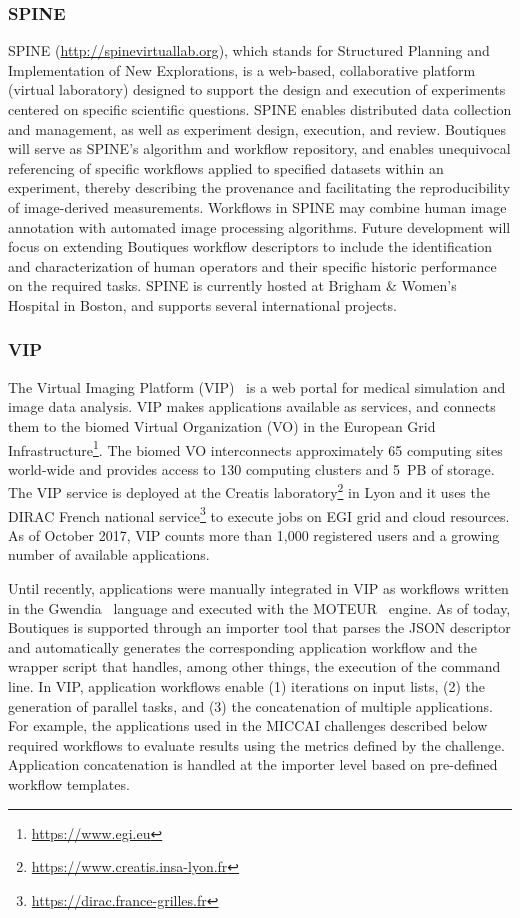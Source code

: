 \documentclass[a4paper,num-refs]{oup-contemporary}
\begin{document}
\subsubsection{SPINE}
SPINE (\url{http://spinevirtuallab.org}), which stands for Structured
Planning and Implementation of New Explorations, is a web-based,
collaborative platform (virtual laboratory) designed to support the
design and execution of experiments centered on specific scientific
questions.  SPINE enables distributed data collection and management,
as well as experiment design, execution, and review. Boutiques will serve
as SPINE's algorithm and workflow repository, and enables unequivocal
referencing of specific workflows applied to specified datasets within
an experiment, thereby describing the provenance and facilitating the
reproducibility of image-derived measurements. Workflows in SPINE may
combine human image annotation with automated image processing
algorithms. Future development will focus on extending Boutiques
workflow descriptors to include the identification and
characterization of human operators and their specific historic
performance on the required tasks. SPINE is currently hosted at
Brigham \& Women's Hospital in Boston, and supports several
international projects.

\subsubsection{VIP}

The Virtual Imaging Platform (VIP)~\cite{GLAT-13} is a web portal for
medical simulation and image data analysis. VIP makes applications
available as services, and connects them to the biomed Virtual
Organization (VO) in the European Grid
Infrastructure\footnote{\url{https://www.egi.eu}}. The biomed VO
interconnects approximately 65 computing sites world-wide and provides
access to 130 computing clusters and 5~PB of storage.  The VIP service
is deployed at the Creatis
laboratory\footnote{\url{https://www.creatis.insa-lyon.fr}} in Lyon
and it uses the DIRAC French national
service\footnote{\url{https://dirac.france-grilles.fr}} to execute
jobs on EGI grid and cloud resources.  As of October 2017, VIP counts
more than 1,000 registered users and a growing number of available
applications.

Until recently, applications were manually integrated in VIP as
workflows written in the Gwendia~\cite{MONT-09} language and executed
with the MOTEUR~\cite{GLAT-08} engine.  As of today, Boutiques is
supported through an importer tool that parses the JSON descriptor and
automatically generates the corresponding application workflow and the
wrapper script that handles, among other things, the execution of the
command line.  In VIP, application workflows enable (1) iterations on
input lists, (2) the generation of parallel tasks, and (3) the
concatenation of multiple applications. For example, the applications
used in the MICCAI challenges described below required workflows to
evaluate results using the metrics defined by the
challenge. Application concatenation is handled at the importer level
based on pre-defined workflow templates.
\end{document}
